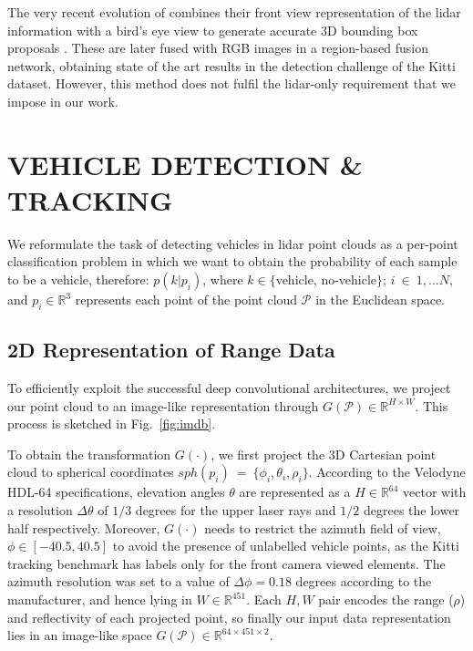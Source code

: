 \documentclass[letterpaper, 10 pt, conference]{ieeeconf}  %
\begin{document}
The very recent evolution of \cite{li2016vehicle} combines their front view representation of the lidar information with a bird's eye view to generate accurate 3D bounding box proposals \cite{chen2016multi}. These are later fused with RGB images in a region-based fusion network, obtaining state of the art results in the detection challenge of the Kitti dataset. However, this method does not fulfil the lidar-only requirement that we impose in our work.


\section{VEHICLE DETECTION \& TRACKING}%
We reformulate the task of detecting vehicles in lidar point clouds as a per-point classification problem in which we want to obtain the probability of each sample to be a vehicle, therefore:
$p(k|p_i)$, where $k \in \{$vehicle, no-vehicle$\}$; $i~\in~1,...N$, and $p_i \in \mathbb{R}^3$ represents each point of the point cloud $\mathcal{P}$ in the Euclidean space. 

\subsection{2D Representation of Range Data}\label{sec:2d_data}%
To efficiently exploit the successful deep convolutional architectures, we project our point cloud to an image-like representation through $G(\mathcal{P}) \in \mathbb{R}^{H \times W}$. This process is sketched in Fig.~\ref{fig:imdb}.

To obtain the transformation $G(\cdot)$, we first project the 3D Cartesian point cloud to spherical coordinates $sph(p_i)~=~\{\phi_i,\theta_i, \rho_i\}$. According to the Velodyne HDL-64 specifications, elevation angles $\theta$ are represented as a $H \in \mathbb{R}^{64}$ vector with a resolution $\Delta\theta$ of $1/3$ degrees for the upper laser rays and $1/2$ degrees the lower half respectively. Moreover, $G(\cdot)$ needs to restrict the azimuth field of view, $\phi \in [-40.5,40.5]$ to avoid the presence of unlabelled vehicle points, as the Kitti tracking benchmark has labels only for the front camera viewed elements. The azimuth resolution was set to a value of  $\Delta\phi=0.18$ degrees according to the manufacturer, and hence lying in $W \in \mathbb{R}^{451}$. 
Each $H,W$ pair encodes the range ($\rho$) and reflectivity of each projected point, so finally our input data representation lies in an image-like space $G(\mathcal{P}) \in \mathbb{R}^{64 \times 451 \times 2}$. 
\end{document}
